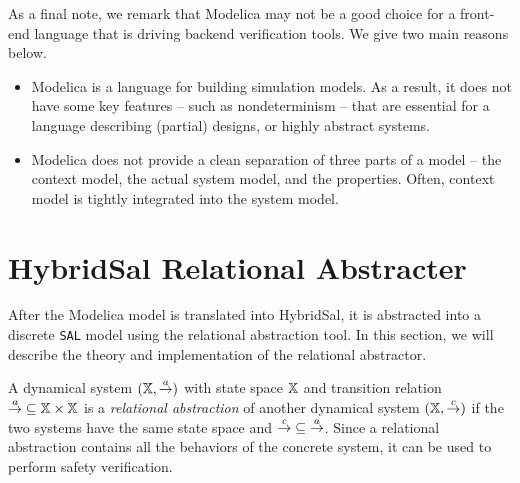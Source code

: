 \documentclass{llncs}
\begin{document}
As a final note, we remark that Modelica may not be a good choice
for a front-end language that is driving backend verification tools.
We give two main reasons below.
\begin{itemize}
\item Modelica is a language for building simulation models.
As a result, it does not have some key features -- such as nondeterminism --
that are essential for a language describing (partial) designs, or
highly abstract systems.
\item Modelica does not provide a clean separation of three parts of a
model -- the context model, the actual system model, and the properties.
Often, context model is tightly integrated into the system model.
\end{itemize}

\section{HybridSal Relational Abstracter}\label{sec-ra}

After the Modelica model is translated into HybridSal, it is
abstracted into a discrete {\tt{SAL}} model using the
relational abstraction tool.  
In this section, we will describe the theory and implementation
of the relational abstractor.


A dynamical system $(\mathbb{X}, {\stackrel{a}{\rightarrow}})$  with state space $\mathbb{X}$ and
transition relation ${\stackrel{a}{\rightarrow}}\subseteq \mathbb{X}\times \mathbb{X}$ 
is a {\em{relational abstraction}} of another 
dynamical system $(\mathbb{X}, {\stackrel{c}{\rightarrow}})$ if
the two systems have the same state space and
${\stackrel{c}{\rightarrow}} \subseteq {\stackrel{a}{\rightarrow}}$.
Since a relational abstraction contains all the behaviors of the
concrete system, it can be used to perform safety verification.
\end{document}
